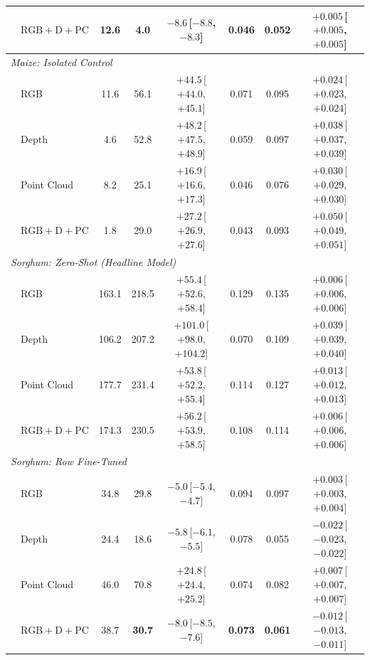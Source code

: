 \documentclass[10pt,twocolumn,letterpaper]{article}
\begin{document}
\begin{table}[t]
\begin{tabular}{l l ccc ccc}
    & $\mathrm{RGB}+\mathrm{D}+\mathrm{PC}$ & 12.6 & \textbf{4.0} & $-8.6$\,{\tiny[$-8.8$, $-8.3$]} & \textbf{0.046} & \textbf{0.052} & $+0.005$\,{\tiny[$+0.005$, $+0.005$]} \\
    \midrule
    \multicolumn{8}{l}{\emph{Maize: Isolated Control}} \\
    & RGB & 11.6 & 56.1 & $+44.5$\,{\tiny[$+44.0$, $+45.1$]} & 0.071 & 0.095 & $+0.024$\,{\tiny[$+0.023$, $+0.024$]} \\
    & Depth & 4.6 & 52.8 & $+48.2$\,{\tiny[$+47.5$, $+48.9$]} & 0.059 & 0.097 & $+0.038$\,{\tiny[$+0.037$, $+0.039$]} \\
    & Point Cloud & 8.2 & 25.1 & $+16.9$\,{\tiny[$+16.6$, $+17.3$]} & 0.046 & 0.076 & $+0.030$\,{\tiny[$+0.029$, $+0.030$]} \\
    & $\mathrm{RGB}+\mathrm{D}+\mathrm{PC}$ & 1.8 & 29.0 & $+27.2$\,{\tiny[$+26.9$, $+27.6$]} & 0.043 & 0.093 & $+0.050$\,{\tiny[$+0.049$, $+0.051$]} \\
    \midrule
    \multicolumn{8}{l}{\emph{Sorghum: Zero-Shot (Headline Model)}} \\
    & RGB & 163.1 & 218.5 & $+55.4$\,{\tiny[$+52.6$, $+58.4$]} & 0.129 & 0.135 & $+0.006$\,{\tiny[$+0.006$, $+0.006$]} \\
    & Depth & 106.2 & 207.2 & $+101.0$\,{\tiny[$+98.0$, $+104.2$]} & 0.070 & 0.109 & $+0.039$\,{\tiny[$+0.039$, $+0.040$]} \\
    & Point Cloud & 177.7 & 231.4 & $+53.8$\,{\tiny[$+52.2$, $+55.4$]} & 0.114 & 0.127 & $+0.013$\,{\tiny[$+0.012$, $+0.013$]} \\
    & $\mathrm{RGB}+\mathrm{D}+\mathrm{PC}$ & 174.3 & 230.5 & $+56.2$\,{\tiny[$+53.9$, $+58.5$]} & 0.108 & 0.114 & $+0.006$\,{\tiny[$+0.006$, $+0.006$]} \\
    \midrule
    \multicolumn{8}{l}{\emph{Sorghum: Row Fine-Tuned}} \\
    & RGB & 34.8 & 29.8 & $-5.0$\,{\tiny[$-5.4$, $-4.7$]} & 0.094 & 0.097 & $+0.003$\,{\tiny[$+0.003$, $+0.004$]} \\
    & Depth & 24.4 & 18.6 & $-5.8$\,{\tiny[$-6.1$, $-5.5$]} & 0.078 & 0.055 & $-0.022$\,{\tiny[$-0.023$, $-0.022$]} \\
    & Point Cloud & 46.0 & 70.8 & $+24.8$\,{\tiny[$+24.4$, $+25.2$]} & 0.074 & 0.082 & $+0.007$\,{\tiny[$+0.007$, $+0.007$]} \\
    & $\mathrm{RGB}+\mathrm{D}+\mathrm{PC}$ & 38.7 & \textbf{30.7} & $-8.0$\,{\tiny[$-8.5$, $-7.6$]} & \textbf{0.073} & \textbf{0.061} & $-0.012$\,{\tiny[$-0.013$, $-0.011$]} \\

\end{tabular}
\end{table}
\end{document}
